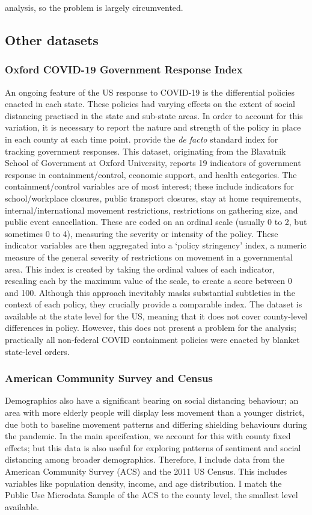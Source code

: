 \documentclass{article}
\begin{document}
analysis, so the problem is largely circumvented.

\subsection{Other datasets}
\subsubsection{Oxford COVID-19 Government Response Index}
An ongoing feature of the US response to COVID-19 is the differential policies enacted in each state. These policies had varying effects on the extent of social distancing practised in the state and sub-state areas. In order to account for this variation, it is necessary to report the nature and strength of the policy in place in each county at each time point. \textcite{petherickVariationGovernmentResponses2020} provide the \textit{de facto} standard index for tracking government responses. This dataset, originating from the Blavatnik School of Government at Oxford University, reports 19 indicators of government response in containment/control, economic support, and health categories. The containment/control variables are of most interest; these include indicators for school/workplace closures, public transport closures, stay at home requirements, internal/international movement restrictions, restrictions on gathering size, and public event cancellation. These are coded on an ordinal scale (usually 0 to 2, but sometimes 0 to 4), measuring the severity or intensity of the policy. These indicator variables are then aggregated into a `policy stringency' index, a numeric measure of the general severity of restrictions on movement in a governmental area. This index is created by taking the ordinal values of each indicator, rescaling each by the maximum value of the scale, to create a score between 0 and 100. Although this approach inevitably masks substantial subtleties in the context of each policy, they crucially provide a comparable index. The dataset is available at the state level for the US, meaning that it does not cover county-level differences in policy. However, this does not present a problem for the analysis; practically all non-federal COVID containment policies were enacted by blanket state-level orders.

\subsubsection{American Community Survey and Census}
Demographics also have a significant bearing on social distancing behaviour; an area with more elderly people will display less movement than a younger district, due both to baseline movement patterns and differing shielding behaviours during the pandemic. In the main specifcation, we account for this with county fixed effects; but this data is also useful for exploring patterns of sentiment and social distancing among broader demographics. Therefore, I include data from the American Community Survey (ACS) and the 2011 US Census. This includes variables like population density, income, and age distribution. I match the Public Use Microdata Sample of the ACS to the county level, the smallest level available. 
\end{document}
